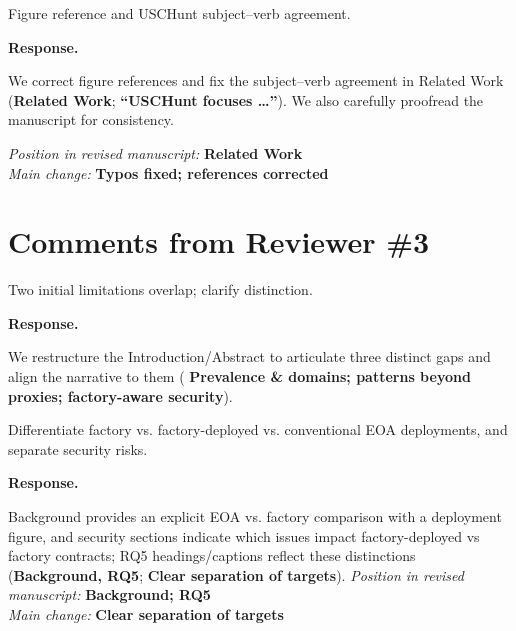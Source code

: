 \documentclass[acmsmall]{acmart}
\begin{document}
	\begin{tcolorbox}
		[commentbox,title=Reviewer \#2 -- Typos] Figure reference and USCHunt subject--verb
		agreement.
	\end{tcolorbox}

	\noindent
	\textbf{Response.}

	We correct figure references and fix the subject–verb agreement in Related Work ({\textbf{Related Work}};
	{\textbf{“USCHunt focuses …”}}). We also carefully proofread the manuscript for consistency.

	\textit{Position in revised manuscript:} {\color{red}\textbf{Related Work}}\\ \textit{Main
	change:} {\color{blue}\textbf{Typos fixed; references corrected}}

	\newpage
	\section{Comments from Reviewer \#3}

	\begin{tcolorbox}
		[commentbox,title=Reviewer \#3 -- Comment 1] Two initial limitations overlap; clarify
		distinction.
	\end{tcolorbox}

	\noindent
	\textbf{Response.}

	We restructure the Introduction/Abstract to articulate three distinct gaps and align the
	narrative to them (
	{\textbf{Prevalence \& domains; patterns beyond proxies; factory-aware security}}).

	\begin{tcolorbox}
		[commentbox,title=Reviewer \#3 -- Comment 2] Differentiate factory vs. factory-deployed vs. conventional
		EOA deployments, and separate security risks.
	\end{tcolorbox}

	\noindent
	\textbf{Response.}

	Background provides an explicit EOA vs. factory comparison with a deployment figure, and
	security sections indicate which issues impact factory-deployed vs factory contracts; RQ5 headings/captions
	reflect these distinctions ({\textbf{Background, RQ5}}; {\textbf{Clear separation of targets}}).
	\textit{Position in revised manuscript:} {\color{red}\textbf{Background; RQ5}}\\ \textit{Main
	change:} {\color{blue}\textbf{Clear separation of targets}}
\end{document}
